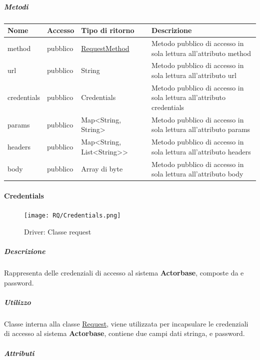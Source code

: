 \documentclass{scalatekids-article}
\begin{document}
\subparagraph{Metodi}

\begin{tabular}{| p{3cm} | p{1.5cm} | p{2.5cm} | p{10cm} |}
  \hline
  Nome & Accesso & Tipo di ritorno & Descrizione\\
  \hline
  method & pubblico & \hyperref[sec:actorbase::driver::client::api::RequestMethod]{RequestMethod} & Metodo pubblico di accesso in sola lettura all'attributo method\\
  \hline
  url & pubblico & String & Metodo pubblico di accesso in sola lettura all'attributo url\\
  \hline
  credentials & pubblico & Credentials & Metodo pubblico di accesso in sola lettura all'attributo credentials\\
  \hline
  params & pubblico & Map<String, String> & Metodo pubblico di accesso in sola lettura all'attributo params\\
  \hline
  headers & pubblico & Map<String, List<String>> & Metodo pubblico di accesso in sola lettura all'attributo headers\\
  \hline
  body & pubblico & Array di byte & Metodo pubblico di accesso in sola lettura all'attributo body\\
  \hline
\end{tabular}


\paragraph{Credentials}
\label{sec:actorbase::driver::client::api::Credentials}
\begin{figure}[H]
  \begin{center}
    \texttt{[image: RQ/Credentials.png]}
    \caption{Driver: Classe request}
  \end{center}
\end{figure}

\subparagraph{Descrizione}

Rappresenta delle credenziali di accesso al sistema \textbf{Actorbase}, composte
da  e password.


\subparagraph{Utilizzo}
Classe interna alla classe \hyperref[sec:actorbase::driver::client::api::Request]{Request}, viene
utilizzata per incapsulare le credenziali di accesso al sistema \textbf{Actorbase}, contiene due campi
dati stringa,  e password.

\subparagraph{Attributi}
\end{document}
